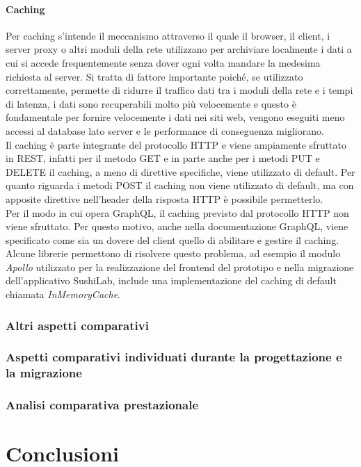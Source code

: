 \paragraph{Caching}
Per caching s'intende il meccanismo attraverso il quale il browser, il client, i server proxy o altri moduli della rete utilizzano per archiviare localmente i dati a cui si accede frequentemente senza dover ogni volta mandare la medesima richiesta al server. Si tratta di fattore importante poiché, se utilizzato correttamente, permette di ridurre il traffico dati tra i moduli della rete e i tempi di latenza, i dati sono recuperabili molto più velocemente e questo è fondamentale per fornire velocemente i dati nei siti web, vengono eseguiti meno accessi al database lato server e le performance di conseguenza migliorano.\\
Il caching è parte integrante del protocollo HTTP e viene ampiamente sfruttato in REST, infatti per il metodo GET e in parte anche per i metodi PUT e DELETE il caching, a meno di direttive specifiche, viene utilizzato di default. Per quanto riguarda i metodi POST il caching non viene utilizzato di default, ma con apposite direttive nell'header della risposta HTTP è possibile permetterlo.\\
Per il modo in cui opera GraphQL, il caching previsto dal protocollo HTTP non viene sfruttato. Per questo motivo, anche nella documentazione GraphQL, viene specificato come sia un dovere del client quello di abilitare e gestire il caching. Alcune librerie permettono di risolvere questo problema, ad esempio il modulo \textit{Apollo} utilizzato per la realizzazione del frontend del prototipo e nella migrazione dell'applicativo SushiLab, include una implementazione del caching di default chiamata \textit{InMemoryCache}.
\subsubsection{Altri aspetti comparativi}
\subsubsection{Aspetti comparativi individuati durante la progettazione e la migrazione}
\subsubsection{Analisi comparativa prestazionale}
\section{Conclusioni}





